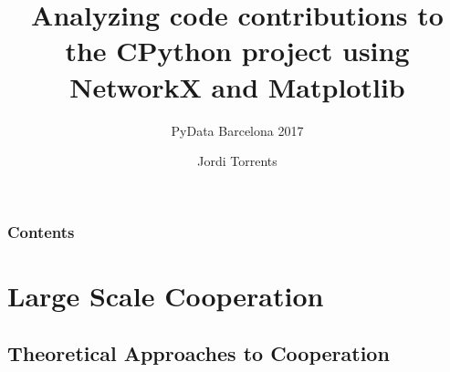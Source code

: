 \documentclass[ignorenonframetext,red,8pt,notes=hide]{beamer}
\title{Analyzing code contributions to the CPython project using NetworkX and Matplotlib}
\subtitle{PyData Barcelona 2017}
\author{Jordi Torrents}
\institute{Department of Sociology\\University of Barcelona}
\begin{document}
\begin{frame}[label=portada]
\maketitle
\end{frame}

\begin{frame}[label=toc]
\frametitle{Contents}
\tableofcontents
\end{frame}

\section{Large Scale Cooperation}

\subsection{Theoretical Approaches to Cooperation}
\end{document}
